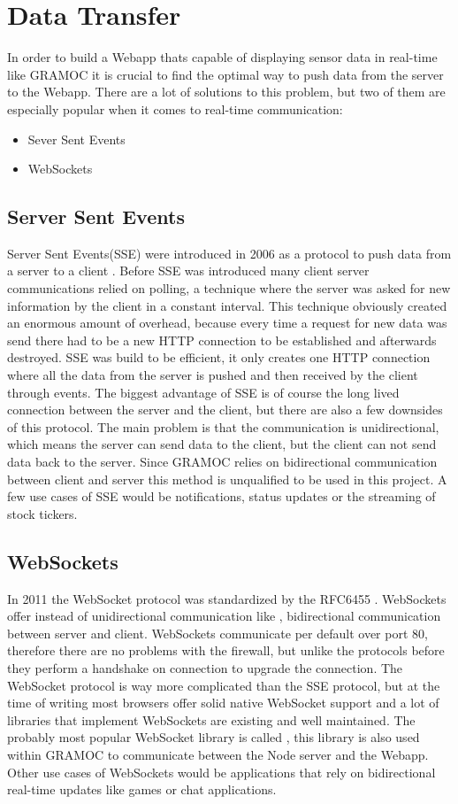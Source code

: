 \section{Data Transfer}
In order to build a Webapp thats capable of displaying sensor data in real-time like GRAMOC it is crucial to find the optimal way to push data from the server to the Webapp. There are a lot of solutions to this problem, but two of them are especially popular when it comes to real-time communication:

\begin{itemize}
    \item Sever Sent Events
    \item WebSockets
\end{itemize}

\subsection{Server Sent Events}
\label{subsec:sse}
Server Sent Events(SSE) were introduced in 2006 as a protocol to push data from a server to a client \cite{sse}. Before SSE was introduced many client server communications relied on polling, a technique where the server was asked for new information by the client in a constant interval. This technique obviously created an enormous amount of overhead, because every time a request for new data was send there had to be a new HTTP connection to be established and afterwards destroyed. SSE was build to be efficient, it only creates one HTTP connection where all the data from the server is pushed and then received by the client through events. The biggest advantage of SSE is of course the long lived connection between the server and the client, but there are also a few downsides of this protocol. The main problem is that the communication is unidirectional, which means the server can send data to the client, but the client can not send data back to the server. Since GRAMOC relies on bidirectional communication between client and server this method is unqualified to be used in this project. A few use cases of SSE would be notifications, status updates or the streaming of stock tickers.

\subsection{WebSockets}
In 2011 the WebSocket protocol was standardized by the RFC6455 \cite{rfc6455}. WebSockets offer instead of unidirectional communication like , bidirectional communication between server and client. WebSockets communicate per default over port 80, therefore there are no problems with the firewall, but unlike the protocols before they perform a handshake on connection to upgrade the connection. The WebSocket protocol is way more complicated than the SSE protocol, but at the time of writing most browsers offer solid native WebSocket support and a lot of libraries that implement WebSockets are existing and well maintained. The probably most popular WebSocket library is called , this library is also used within GRAMOC to communicate between the Node server and the Webapp. Other use cases of WebSockets would be applications that rely on bidirectional real-time updates like games or chat applications.
